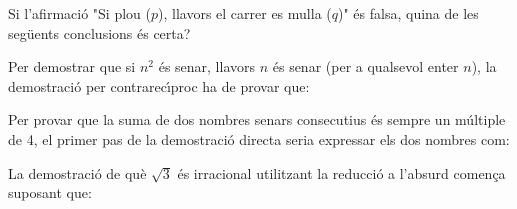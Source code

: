 \begin{enumerate}
\begin{enumerate}
{}
\end{enumerate}
\feedback

\pregunta Si l'afirmaci\'{o} "Si plou ($p$), llavors el carrer es mulla ($q$)"
\'{e}s falsa, quina de les seg\"{u}ents conclusions \'{e}s certa?

\begin{enumerate}
\end{enumerate}
\feedback

\pregunta Per demostrar que si $n^{2}$ \'{e}s senar, llavors $n$ \'{e}s senar (per
a qualsevol enter $n$), la demostraci\'{o} per contrarec\'{\i}proc ha de
provar que:

\begin{enumerate}
\end{enumerate}
\feedback

\pregunta Per provar que la suma de dos nombres senars consecutius \'{e}s sempre
un m\'{u}ltiple de 4, el primer pas de la demostraci\'{o} directa seria
expressar els dos nombres com:

\begin{enumerate}
\end{enumerate}
\feedback

\pregunta La demostraci\'{o} de qu\`{e} $\sqrt{3}$ \'{e}s irracional utilitzant la
reducci\'{o} a l'absurd comen\c{c}a suposant que:

\begin{enumerate}
\end{enumerate}
\end{enumerate}

